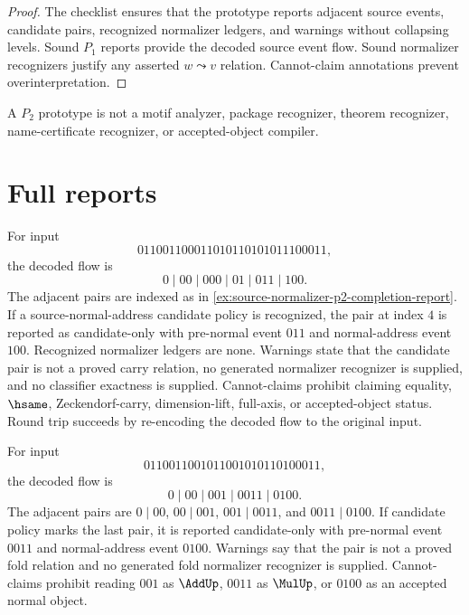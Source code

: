 \begin{proof}
The checklist ensures that the prototype reports adjacent source events, candidate pairs, recognized normalizer ledgers, and warnings without collapsing levels. Sound $P_1$ reports provide the decoded source event flow. Sound normalizer recognizers justify any asserted $w\leadsto v$ relation. Cannot-claim annotations prevent overinterpretation.
\end{proof}

\begin{corollary}
\label{cor:source-normalizer-p2-not-higher}
A $P_2$ prototype is not a motif analyzer, package recognizer, theorem recognizer, name-certificate recognizer, or accepted-object compiler.
\end{corollary}

\section{Full reports}
\label{sec:source-normalizer-full-reports}

\begin{example}
\label{ex:source-normalizer-full-completion-report}
For input
$$
  011001100011010110101011100011,
$$
the decoded flow is
$$
  0\mid 00\mid 000\mid 01\mid 011\mid 100.
$$
The adjacent pairs are indexed as in \autoref{ex:source-normalizer-p2-completion-report}. If a source-normal-address candidate policy is recognized, the pair at index $4$ is reported as candidate-only with pre-normal event $011$ and normal-address event $100$. Recognized normalizer ledgers are none. Warnings state that the candidate pair is not a proved carry relation, no generated normalizer recognizer is supplied, and no classifier exactness is supplied. Cannot-claims prohibit claiming equality, $\hsame$, Zeckendorf-carry, dimension-lift, full-axis, or accepted-object status. Round trip succeeds by re-encoding the decoded flow to the original input.
\end{example}

\begin{example}
\label{ex:source-normalizer-full-fold-report}
For input
$$
  0110011001011001010110100011,
$$
the decoded flow is
$$
  0\mid 00\mid 001\mid 0011\mid 0100.
$$
The adjacent pairs are $0\mid 00$, $00\mid 001$, $001\mid 0011$, and $0011\mid 0100$. If candidate policy marks the last pair, it is reported candidate-only with pre-normal event $0011$ and normal-address event $0100$. Warnings say that the pair is not a proved fold relation and no generated fold normalizer recognizer is supplied. Cannot-claims prohibit reading $001$ as $\AddUp$, $0011$ as $\MulUp$, or $0100$ as an accepted normal object.
\end{example}

